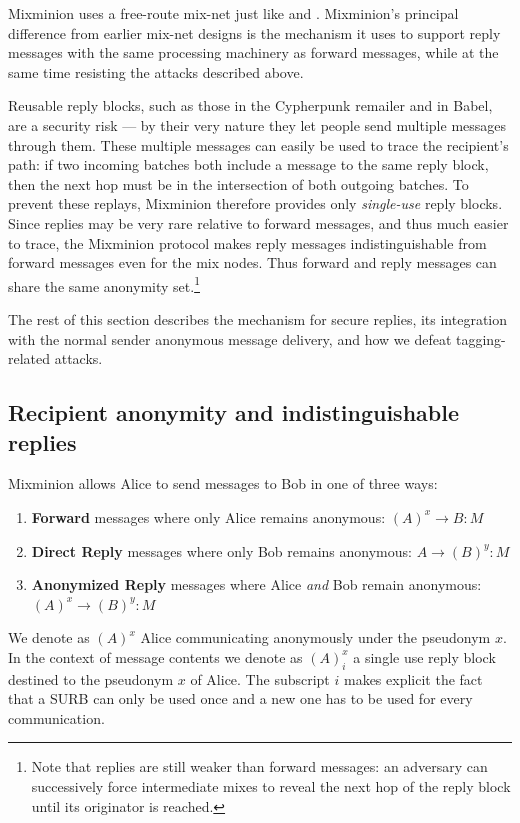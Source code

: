\documentclass[11pt]{IEEEtran}
\begin{document}
Mixminion uses a free-route mix-net just like \cite{mixmaster-spec}
and \cite{babel}. Mixminion's principal difference from earlier mix-net
designs is the mechanism it uses to support reply messages with the
same processing machinery as forward messages, while at the same time
resisting the attacks described above.

Reusable reply blocks, such as those in the Cypherpunk remailer and
in Babel, are a security risk --- by their very nature they let people
send multiple
messages through them.  These multiple messages can easily be used to
trace the recipient's path: if two incoming batches both include a
message to the same reply block, then the next hop must be in the
intersection of both outgoing batches.  To prevent these replays,
Mixminion therefore provides only \emph{single-use} reply blocks. Since
replies may be very rare relative to forward messages, and thus
much easier to trace, the Mixminion protocol makes reply messages
indistinguishable from forward messages even for the mix nodes. Thus
forward and reply messages can share the same anonymity
set.\footnote{Note that replies are still weaker than forward messages:
an adversary can successively force intermediate mixes to reveal the
next hop of the reply block until its originator is reached.}

The rest of this section describes the mechanism for secure replies,
its integration with the normal sender anonymous message delivery, and
how we defeat tagging-related attacks.  

\subsection{Recipient anonymity and indistinguishable replies}
\label{subsec:replies}
\label{subsec:header-swap}

Mixminion allows Alice to send messages to Bob in one of three ways:

\begin{enumerate}
\item \textbf{Forward} messages where only Alice remains anonymous:
$(A)^x \rightarrow B: M$
\item \textbf{Direct Reply} messages where only Bob remains anonymous:
$A \rightarrow (B)^y: M$
\item \textbf{Anonymized Reply} messages where Alice \emph{and} Bob
   remain anonymous: $(A)^x \rightarrow (B)^y: M$
\end{enumerate}

We denote as $(A)^x$ Alice communicating anonymously under the
pseudonym $x$. In the context of message contents we denote as
$(A)^x_i$ a single use reply block destined to the pseudonym $x$ of
Alice. The subscript $i$ makes explicit the fact that a SURB can only
be used once and a new one has to be used for every communication.
\end{document}
